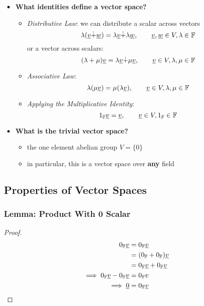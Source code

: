 \documentclass{exam}
\begin{document}
\begin{itemize}
\begin{itemize}
    \end{itemize}
    \item \textbf{What identities define a vector space?}
    \begin{itemize}
        \item \textit{Distributive Law}: we can distribute a scalar across vectors
        \[
        \lambda(\underline{v} \dot{+} \underline{w}) = \lambda \underline{v} \dot{+} \lambda \underline{w}, \qquad \underline{v},\underline{w} \in V, \lambda \in \mathbb{F}
        \]
        or a vector across scalars:
        \[
        (\lambda + \mu)\underline{v} = \lambda \underline{v} \dot{+} \mu \underline{v}, \qquad \underline{v} \in V, \lambda, \mu \in \mathbb{F}
        \]
        \item \textit{Associative Law}:
        \[
        \lambda(\mu \underline{v}) = \mu (\lambda \underline{v}), \qquad \underline{v} \in V, \lambda, \mu \in \mathbb{F}
        \]
        \item \textit{Applying the Multiplicative Identity}:
        \[
        1_{\mathbb{F}} \underline{v} = \underline{v}, \qquad \underline{v} \in V, 1_{\mathbb{F}} \in \mathbb{F}
        \]
    \end{itemize}
    \item \textbf{What is the trivial vector space?}
    \begin{itemize}
        \item the one element abelian group $V = \{0\}$
        \item in particular, this is a vector space over \textbf{any} field
    \end{itemize}
\end{itemize}

\subsection{Properties of Vector Spaces}

\subsubsection{Lemma: Product With 0 Scalar}


\begin{proof}
\begin{align*}
    0_{\mathbb{F}} \underline{v} &= 0_{\mathbb{F}} \underline{v} \\
    &= (0_{\mathbb{F}} + 0_{\mathbb{F}}) \underline{v} \\
    &= 0_{\mathbb{F}} \underline{v} + 0_{\mathbb{F}} \underline{v} \\ 
    \implies 0_{\mathbb{F}} \underline{v} - 0_{\mathbb{F}} \underline{v} &= 0_{\mathbb{F}} v \\
    \implies \underline{0} &= 0_{\mathbb{F}} \underline{v} \\
\end{align*}
\end{proof}
\end{document}
